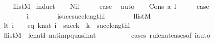 \begin{isabellebody}
%
\isadelimproof
\ \ %
\endisadelimproof
%
\isatagproof
{}\isamarkupfalse%
\ {\isacartoucheopen}l{\isasymin}list{\isacharparenleft}{\kern0pt}M{\isacharparenright}{\kern0pt}{\isacartoucheclose}\isanewline
{}\isamarkupfalse%
\ induct\isanewline
\ \ \isamarkupfalse%
\ Nil\isanewline
\ \ \isamarkupfalse%
\ \isamarkupfalse%
\ {\isacharquery}{\kern0pt}case\ \isamarkupfalse%
\ auto\isanewline
{}\isamarkupfalse%
\isanewline
\ \ \isamarkupfalse%
\ {\isacharparenleft}{\kern0pt}Cons\ a\ l{\isacharparenright}{\kern0pt}\isanewline
\ \ \isamarkupfalse%
\ \isamarkupfalse%
\ {\isacharquery}{\kern0pt}case\isanewline
\ \ \isamarkupfalse%
\ {\isacharminus}{\kern0pt}\isanewline
\ \ \ \ \isacommand{{\isacharbraceleft}{\kern0pt}}\isamarkupfalse%
\isanewline
\ \ \ \ \ \ \isamarkupfalse%
\ i\isanewline
\ \ \ \ \ \ \isamarkupfalse%
\ {\isachardoublequoteopen}i{\isacharless}{\kern0pt}succ{\isacharparenleft}{\kern0pt}succ{\isacharparenleft}{\kern0pt}length{\isacharparenleft}{\kern0pt}l{\isacharparenright}{\kern0pt}{\isacharparenright}{\kern0pt}{\isacharparenright}{\kern0pt}{\isachardoublequoteclose}\isanewline
\ \ \ \ \ \ \isamarkupfalse%
\ {\isacartoucheopen}l{\isasymin}list{\isacharparenleft}{\kern0pt}M{\isacharparenright}{\kern0pt}{\isacartoucheclose}\isanewline
\ \ \ \ \ \ \isamarkupfalse%
\ {\isacharparenleft}{\kern0pt}lt{\isacharparenright}{\kern0pt}\ {\isachardoublequoteopen}i\ {\isacharequal}{\kern0pt}\ {}{\isachardoublequoteclose}\ {\isacharbar}{\kern0pt}\ {\isacharparenleft}{\kern0pt}eq{\isacharparenright}{\kern0pt}\ {\isachardoublequoteopen}{\isasymexists}k{\isasymin}nat{\isachardot}{\kern0pt}\ i\ {\isacharequal}{\kern0pt}\ succ{\isacharparenleft}{\kern0pt}k{\isacharparenright}{\kern0pt}\ {\isasymand}\ k\ {\isacharless}{\kern0pt}\ succ{\isacharparenleft}{\kern0pt}length{\isacharparenleft}{\kern0pt}l{\isacharparenright}{\kern0pt}{\isacharparenright}{\kern0pt}{\isachardoublequoteclose}\isanewline
\ \ \ \ \ \ \ \ \isamarkupfalse%
\ {\isacartoucheopen}l{\isasymin}list{\isacharparenleft}{\kern0pt}M{\isacharparenright}{\kern0pt}{\isacartoucheclose}\ \ le{\isacharunderscore}{\kern0pt}natI\ nat{\isacharunderscore}{\kern0pt}imp{\isacharunderscore}{\kern0pt}quasinat\isanewline
\ \ \ \ \ \ \ \ \isamarkupfalse%
\ {\isacharparenleft}{\kern0pt}cases\ rule{\isacharcolon}{\kern0pt}nat{\isacharunderscore}{\kern0pt}cases{\isacharbrackleft}{\kern0pt}of\ i{\isacharbrackright}{\kern0pt}{\isacharsemicolon}{\kern0pt}auto{\isacharparenright}{\kern0pt}\isanewline

\end{isabellebody}
